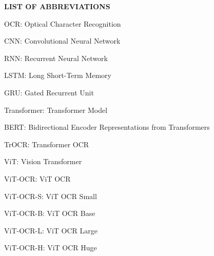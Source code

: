 \begin{center}
    {\englishfont\fontsize{14pt}{21pt}\selectfont \textbf{LIST OF ABBREVIATIONS} \par}
\end{center}
\label{loa}

\begin{adjustwidth}{0.2cm}{0.2cm}

    \vspace{1cm}
    \setlength{\parindent}{0pt}
    \vspace{0.3cm}
    {\large OCR: Optical Character Recognition\dotfill\par}
    {\large CNN: Convolutional Neural Network\dotfill\par}
    {\large RNN: Recurrent Neural Network\dotfill\par}
    {\large LSTM: Long Short-Term Memory\dotfill\par}
    {\large GRU: Gated Recurrent Unit\dotfill\par}
    {\large Transformer: Transformer Model\dotfill\par}
    {\large BERT: Bidirectional Encoder Representations from Transformers\dotfill\par}
    {\large TrOCR: Transformer OCR\dotfill\par}
    {\large ViT: Vision Transformer\dotfill\par}
    {\large ViT-OCR: ViT OCR\dotfill\par}
    {\large ViT-OCR-S: ViT OCR Small\dotfill\par}
    {\large ViT-OCR-B: ViT OCR Base\dotfill\par}
    {\large ViT-OCR-L: ViT OCR Large\dotfill\par}
    {\large ViT-OCR-H: ViT OCR Huge\dotfill\par}

\end{adjustwidth}
